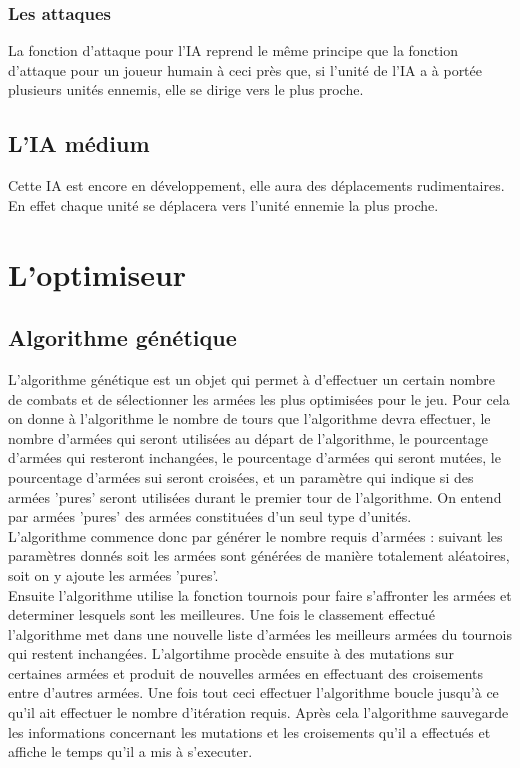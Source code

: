\documentclass{article}
\begin{document}
  \subsubsection{Les attaques} 
 La fonction d'attaque pour l'IA reprend le même principe que la fonction d'attaque pour un joueur humain à ceci près que, si l'unité de l'IA a à portée plusieurs unités ennemis, elle se dirige vers le plus proche. 
 
 \subsection{L'IA médium}
 Cette IA est encore en développement, elle aura des déplacements rudimentaires. En effet chaque unité se déplacera vers l'unité ennemie la plus proche.
 
\section{L'optimiseur}


\subsection{Algorithme génétique}
L'algorithme génétique est un objet qui permet à d'effectuer un certain nombre de combats et de sélectionner les armées les plus optimisées pour le jeu. Pour cela on donne à l'algorithme le nombre de tours que l'algorithme devra effectuer, le nombre d'armées qui seront utilisées au départ de l'algorithme, le pourcentage d'armées qui resteront inchangées, le pourcentage d'armées qui seront mutées, le pourcentage d'armées sui seront croisées, et un paramètre qui indique si des armées 'pures' seront utilisées durant le premier tour de l'algorithme. On entend par armées 'pures' des armées constituées d'un seul type d'unités. \\
L'algorithme commence donc par générer le nombre requis d'armées : suivant les paramètres donnés soit les armées sont générées de manière totalement aléatoires, soit on y ajoute les armées 'pures'. \\
Ensuite l'algorithme utilise la fonction tournois pour faire s'affronter les armées et determiner lesquels sont les meilleures. Une fois le classement effectué l'algorithme met dans une nouvelle liste d'armées les meilleurs armées du tournois qui restent inchangées. L'algortihme procède ensuite à des mutations sur certaines armées et produit de nouvelles armées en effectuant des croisements entre d'autres armées. Une fois tout ceci effectuer l'algorithme boucle jusqu'à ce qu'il ait effectuer le nombre d'itération requis. Après cela l'algorithme sauvegarde les informations concernant les mutations et  les croisements qu'il a effectués et affiche le temps qu'il a mis à s'executer.
\end{document}
